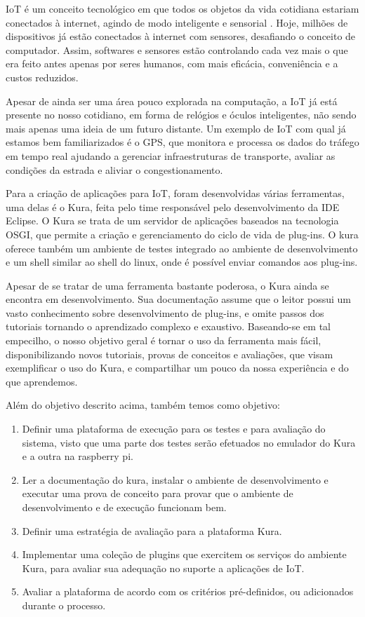IoT é um conceito tecnológico em que todos os objetos da vida cotidiana estariam conectados à internet, agindo de modo inteligente e sensorial \cite{IoTSignificado}. Hoje, milhões de dispositivos já estão conectados à internet com sensores, desafiando o conceito de computador. Assim, softwares e sensores estão controlando cada vez mais o que era feito antes apenas por seres humanos, com mais eficácia, conveniência e a custos reduzidos.

Apesar de ainda ser uma área pouco explorada na computação, a IoT já está presente no nosso cotidiano, em forma de relógios e óculos inteligentes, não sendo mais apenas uma ideia de um futuro distante. Um exemplo de IoT com qual já estamos bem familiarizados é o GPS, que monitora e processa os dados do tráfego em tempo real ajudando a gerenciar infraestruturas de transporte, avaliar as condições da estrada e aliviar o congestionamento.

Para a criação de aplicações para IoT, foram desenvolvidas várias ferramentas, uma delas é o Kura, feita pelo time responsável pelo desenvolvimento da IDE Eclipse. O Kura se trata de um servidor de aplicações baseados na tecnologia OSGI, que permite a criação e gerenciamento do ciclo de vida de plug-ins. O kura oferece também um ambiente de testes integrado ao ambiente de desenvolvimento e um shell similar ao shell do linux, onde é possível enviar comandos aos plug-ins.


Apesar de se tratar de uma ferramenta bastante poderosa, o Kura ainda se encontra em desenvolvimento. Sua documentação assume que o leitor possui um vasto conhecimento sobre desenvolvimento de plug-ins, e omite passos dos tutoriais tornando o aprendizado complexo e exaustivo. Baseando-se em tal empecilho, o nosso objetivo geral é tornar o uso da ferramenta mais fácil, disponibilizando novos tutoriais, provas de conceitos e avaliações, que visam exemplificar o uso do Kura, e compartilhar um pouco da nossa experiência e do que aprendemos.


Além do objetivo descrito acima, também temos como objetivo:

\begin{enumerate}
\item Definir uma plataforma de execução para os testes e para avaliação do sistema, visto que uma parte dos testes serão efetuados no emulador do Kura e a outra na raspberry pi.
\item Ler a documentação do kura, instalar o ambiente de desenvolvimento e executar uma prova de conceito para provar que o ambiente de desenvolvimento e de execução funcionam bem.
\item Definir uma estratégia de avaliação para a plataforma Kura.
\item Implementar uma coleção de plugins que exercitem os serviços do ambiente Kura, para avaliar sua adequação no suporte a aplicações de IoT.
\item Avaliar a plataforma de acordo com os critérios pré-definidos, ou adicionados durante o processo.
\end{enumerate}

